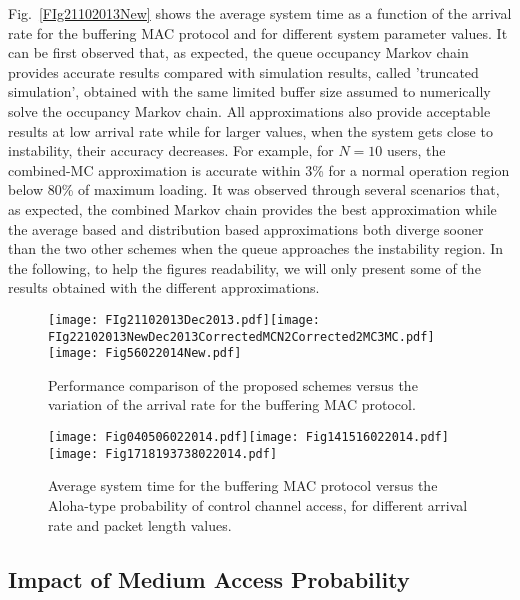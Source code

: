 \documentclass[12pt,journal,oneside,onecolumn]{IEEEtran}
\begin{document}
Fig.~\ref{FIg21102013New} shows the average system time as a
function of the arrival rate for the buffering MAC protocol and for different system parameter values. 
It can be first observed that, as expected, the queue occupancy Markov chain 
provides accurate results compared with simulation results, called 'truncated simulation', obtained
with the same limited buffer size assumed to numerically solve the occupancy Markov chain. 
All approximations also provide acceptable results at low arrival rate while for larger values, when
the system gets close to instability, their accuracy decreases. 
For example, for $N=10$ users, the combined-MC approximation is accurate within 3\% for a normal operation region
below 80\% of maximum loading. It was observed through several scenarios that, as expected, the combined Markov chain
provides the best approximation while the average based and distribution based approximations both diverge sooner 
than the two other schemes when the queue approaches the instability region.
In the following, to help the figures readability, we will only present some of the results obtained with the different approximations.
\begin{figure*}\texttt{[image: FIg21102013Dec2013.pdf]}\texttt{[image: FIg22102013NewDec2013CorrectedMCN2Corrected2MC3MC.pdf]} 
\texttt{[image: Fig56022014New.pdf]}
\caption{Performance comparison of the proposed schemes versus the variation of the arrival rate for the buffering MAC protocol.}
\label{FIg21102013New}\vspace{1em}
\texttt{[image: Fig040506022014.pdf]}\texttt{[image: Fig141516022014.pdf]}\\\texttt{[image: Fig1718193738022014.pdf]}\caption{Average system time for the buffering MAC protocol versus the Aloha-type probability of control channel access, for different arrival rate and packet length values.}\label{FigPVariable3LambdasOnlySim}\end{figure*}


\subsection{Impact of Medium Access Probability}
\end{document}
